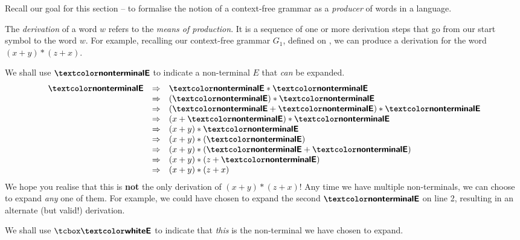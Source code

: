 Recall our goal for this section -- to formalise the notion of a context-free grammar as a \textit{producer} of words in a language. 

The \textit{derivation} of a word $w$ refers to the \textit{means of production}. It is a sequence of one or more derivation steps that go from our start symbol to the word $w$. For example, recalling our context-free grammar $G_1$, defined on , we can produce a derivation for the word $(x + y) * (z + x)$. 

We shall use $\nonterminal{E}$ to indicate a non-terminal $E$ that \textit{can} be expanded.
\[
    \begin{array}{rcl}
        \nonterminal{E} &\Rightarrow& \nonterminal{E}*\nonterminal{E} \\
          &\Rightarrow& (\nonterminal{E})*\nonterminal{E}\\
          &\Rightarrow& (\nonterminal{E}+\nonterminal{E})*\nonterminal{E}\\
          &\Rightarrow& (x+\nonterminal{E})*\nonterminal{E}\\
          &\Rightarrow& (x+y)*\nonterminal{E}\\
          &\Rightarrow& (x+y)*(\nonterminal{E})\\
          &\Rightarrow& (x+y)*(\nonterminal{E}+\nonterminal{E})\\
          &\Rightarrow& (x+y)*(z+\nonterminal{E})\\
          &\Rightarrow& (x+y)*(z+x)\\
      \end{array}
\]
We hope you realise that this is \textbf{not} the only derivation of $(x + y) * (z + x)$! Any time we have multiple non-terminals, we can choose to expand \textit{any} one of them. For example, we could have chosen to expand the second $\nonterminal{E}$ on line 2, resulting in an alternate (but valid!) derivation.

We shall use $\selectedNonTerminal{E}$ to indicate that \textit{this} is the non-terminal we have chosen to expand.


